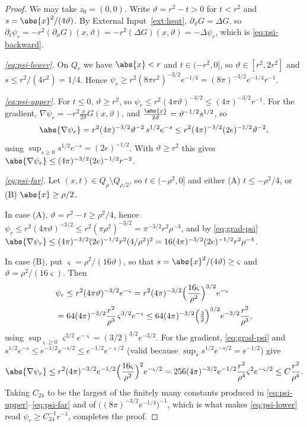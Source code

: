 \documentclass[11pt,reqno]{amsart}
\begin{document}
\begin{proof}
We may take $z_{0}=(0,0)$. Write $\vartheta=r^{2}-t>0$ for $t<r^{2}$ and
$s=\abs{x}^{2}/(4\vartheta)$. By External Input~\ref{ext:heat},
$\partial_{\vartheta}G=\Delta G$, so
$\partial_{t}\psi_{r}=-r^{2}(\partial_{\vartheta}G)(x,\vartheta)
 =-r^{2}(\Delta G)(x,\vartheta)=-\Delta\psi_{r}$, which is
\eqref{eq:psi-backward}.

\emph{\eqref{eq:psi-lower}.} On $Q_{r}$ we have $\abs{x}<r$ and
$t\in(-r^{2},0]$, so $\vartheta\in[r^{2},2r^{2}]$ and $s\le r^{2}/(4r^{2})=1/4$.
Hence
$\psi_{r}\ge r^{2}(8\pi r^{2})^{-3/2}e^{-1/4}=(8\pi)^{-3/2}e^{-1/4}r^{-1}$.

\emph{\eqref{eq:psi-upper}.} For $t\le0$, $\vartheta\ge r^{2}$, so
$\psi_{r}\le r^{2}(4\pi\vartheta)^{-3/2}\le(4\pi)^{-3/2}r^{-1}$. For the
gradient, $\nabla\psi_{r}=-r^{2}\frac{x}{2\vartheta}G(x,\vartheta)$, and
$\frac{\abs{x}}{2\vartheta}=\vartheta^{-1/2}s^{1/2}$, so
\begin{equation}\label{eq:grad-psi}
  \abs{\nabla\psi_{r}}
  =r^{2}(4\pi)^{-3/2}\vartheta^{-2}\,s^{1/2}e^{-s}
  \le r^{2}(4\pi)^{-3/2}(2e)^{-1/2}\vartheta^{-2},
\end{equation}
using $\sup_{s\ge0}s^{1/2}e^{-s}=(2e)^{-1/2}$. With $\vartheta\ge r^{2}$ this
gives $\abs{\nabla\psi_{r}}\le(4\pi)^{-3/2}(2e)^{-1/2}r^{-2}$.

\emph{\eqref{eq:psi-far}.} Let $(x,t)\in Q_{\rho}\setminus Q_{\rho/2}$, so
$t\in(-\rho^{2},0]$ and either (A) $t\le-\rho^{2}/4$, or (B)
$\abs{x}\ge\rho/2$.

In case (A), $\vartheta=r^{2}-t\ge\rho^{2}/4$, hence
$\psi_{r}\le r^{2}(4\pi\vartheta)^{-3/2}\le r^{2}(\pi\rho^{2})^{-3/2}
 =\pi^{-3/2}r^{2}\rho^{-3}$, and by \eqref{eq:grad-psi}
$\abs{\nabla\psi_{r}}\le(4\pi)^{-3/2}(2e)^{-1/2}r^{2}(4/\rho^{2})^{2}
 =16(4\pi)^{-3/2}(2e)^{-1/2}r^{2}\rho^{-4}$.

In case (B), put $\varsigma=\rho^{2}/(16\vartheta)$, so that
$s=\abs{x}^{2}/(4\vartheta)\ge\varsigma$ and $\vartheta=\rho^{2}/(16\varsigma)$.
Then
\[\begin{aligned}
  &\psi_{r}\le r^{2}(4\pi\vartheta)^{-3/2}e^{-\varsigma}
  =r^{2}(4\pi)^{-3/2}\Bigl(\frac{16\varsigma}{\rho^{2}}\Bigr)^{3/2}e^{-\varsigma}
  \\ &=64(4\pi)^{-3/2}\frac{r^{2}}{\rho^{3}}\,\varsigma^{3/2}e^{-\varsigma}
  \le64(4\pi)^{-3/2}\Bigl(\tfrac32\Bigr)^{3/2}e^{-3/2}\frac{r^{2}}{\rho^{3}},
\end{aligned}\]
using $\sup_{\varsigma\ge0}\varsigma^{3/2}e^{-\varsigma}=(3/2)^{3/2}e^{-3/2}$.
For the gradient, \eqref{eq:grad-psi} and
$s^{1/2}e^{-s}\le e^{-1/2}e^{-s/2}\le e^{-1/2}e^{-\varsigma/2}$ (valid because
$\sup_{s}s^{1/2}e^{-s/2}=e^{-1/2}$) give
\[
  \abs{\nabla\psi_{r}}\le r^{2}(4\pi)^{-3/2}e^{-1/2}
    \Bigl(\frac{16\varsigma}{\rho^{2}}\Bigr)^{2}e^{-\varsigma/2}
  =256(4\pi)^{-3/2}e^{-1/2}\frac{r^{2}}{\rho^{4}}\varsigma^{2}e^{-\varsigma/2}
  \le C\frac{r^{2}}{\rho^{4}} .
\]
Taking $C_{24}$ to be the largest of the finitely many constants produced in
\eqref{eq:psi-upper}--\eqref{eq:psi-far} and of
$\bigl((8\pi)^{-3/2}e^{-1/4}\bigr)^{-1}$, which is what makes
\eqref{eq:psi-lower} read $\psi_{r}\ge C_{24}^{-1}r^{-1}$, completes the proof.
\end{proof}
\end{document}
